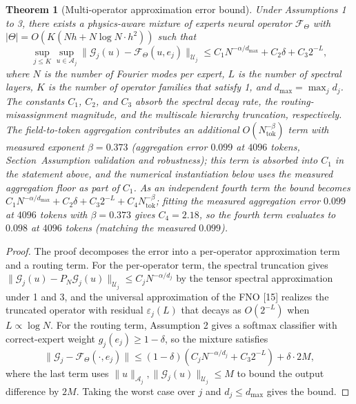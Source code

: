 \documentclass[preprint,12pt]{elsarticle}
\newtheorem{theorem}{Theorem}
\begin{document}
\begin{theorem}[Multi-operator approximation error bound]
Under Assumptions 1 to 3, there exists a physics-aware mixture of experts neural operator $\mathcal{F}_\Theta$ with $|\Theta|=O(K(Nh+N\log N\cdot h^2))$ such that
\begin{equation}
\sup_{j\le K}\sup_{u\in\mathcal{A}_j}\|\mathcal{G}_j(u)-\mathcal{F}_\Theta(u,e_j)\|_{\mathcal{U}_j}\le C_1 N^{-\alpha/d_{\max}}+C_2\delta+C_3 2^{-L},
\end{equation}
where $N$ is the number of Fourier modes per expert, $L$ is the number of spectral layers, $K$ is the number of operator families that satisfy 1, and $d_{\max}=\max_j d_j$. The constants $C_1$, $C_2$, and $C_3$ absorb the spectral decay rate, the routing-misassignment magnitude, and the multiscale hierarchy truncation, respectively. The field-to-token aggregation contributes an additional $O(N_{\mathrm{tok}}^{-\beta})$ term with measured exponent $\beta=0.373$ (aggregation error $0.099$ at $4096$ tokens, Section~Assumption validation and robustness); this term is absorbed into $C_1$ in the statement above, and the numerical instantiation below uses the measured aggregation floor as part of $C_1$. As an independent fourth term the bound becomes $C_1 N^{-\alpha/d_{\max}}+C_2\delta+C_3 2^{-L}+C_4 N_{\mathrm{tok}}^{-\beta}$; fitting the measured aggregation error $0.099$ at $4096$ tokens with $\beta=0.373$ gives $C_4=2.18$, so the fourth term evaluates to $0.098$ at $4096$ tokens (matching the measured $0.099$).
\end{theorem}

\begin{proof}
The proof decomposes the error into a per-operator approximation term and a routing term. For the per-operator term, the spectral truncation gives $\|\mathcal{G}_j(u)-P_N\mathcal{G}_j(u)\|_{\mathcal{U}_j}\le C_j N^{-\alpha/d_j}$ by the tensor spectral approximation under 1 and 3, and the universal approximation of the FNO [15] realizes the truncated operator with residual $\varepsilon_j(L)$ that decays as $O(2^{-L})$ when $L\propto\log N$. For the routing term, Assumption 2 gives a softmax classifier with correct-expert weight $g_j(e_j)\ge 1-\delta$, so the mixture satisfies
\begin{equation}
\|\mathcal{G}_j-\mathcal{F}_\Theta(\cdot,e_j)\|\le(1-\delta)(C_jN^{-\alpha/d_j}+C_3 2^{-L})+\delta\cdot 2M,
\end{equation}
where the last term uses $\|u\|_{\mathcal{A}_j},\|\mathcal{G}_j(u)\|_{\mathcal{U}_j}\le M$ to bound the output difference by $2M$. Taking the worst case over $j$ and $d_j\le d_{\max}$ gives the bound.
\end{proof}
\end{document}
